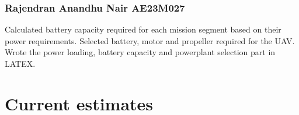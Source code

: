 \documentclass[12 pt]{article}
\begin{document}
\subsubsection{Rajendran Anandhu Nair AE23M027}
Calculated battery capacity required for each mission segment based on their power requirements. Selected battery, motor and propeller required for the UAV. Wrote the power loading, battery capacity and powerplant selection part in LATEX. 

\section{Current estimates}
\end{document}

